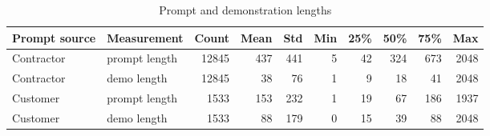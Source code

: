 \documentclass{article}
\begin{document}
\begin{table}[tp]
    \centering
    \caption{Prompt and demonstration lengths}
    \label{tab:prompt-and-demo-length}
    \begin{tabular}{llrrrrrrrr}
    \toprule 
    Prompt source & Measurement & Count  & Mean  & Std  & Min  & 25\%  & 50\%  & 75\%  & Max \\
    \midrule
    Contractor & prompt length  & 12845 & 437 & 441 & 5 & 42 & 324 & 673 & 2048 \\
    Contractor & demo length & 12845 & 38 & 76 & 1 & 9 & 18 & 41 & 2048 \\
    Customer & prompt length & 1533 & 153 & 232 & 1 & 19 & 67 & 186 & 1937 \\
    Customer & demo length & 1533 & 88 & 179 & 0 & 15 & 39 & 88 & 2048 \\
    \bottomrule
    \end{tabular}
\end{table}
\end{document}
